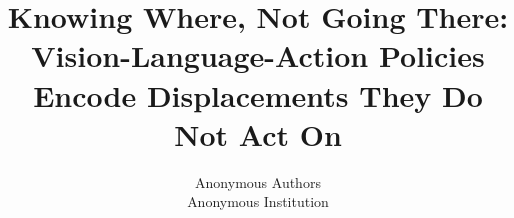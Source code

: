 \documentclass[10pt,twocolumn,letterpaper]{article}
\title{Knowing Where, Not Going There:\\Vision-Language-Action Policies Encode Displacements They Do Not Act On}
\author{Anonymous Authors\\
Anonymous Institution\\
}
\begin{document}
\maketitle









{
    \small
    
    
}


\end{document}
